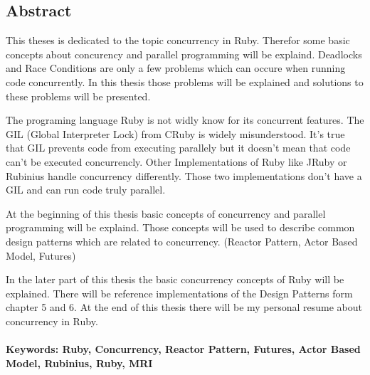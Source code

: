 \subsection*{Abstract}

This theses is dedicated to the topic concurrency in Ruby. Therefor some basic concepts about concurency and parallel programming will be explaind. Deadlocks and Race Conditions are only a few problems which can occure when running code concurrently. In this thesis those problems will be explained and solutions to these problems will be presented. 

The programing language Ruby is not widly know for its concurrent features. The GIL (Global Interpreter Lock) from CRuby is widely misunderstood. It's true that GIL prevents code from executing parallely but it doesn't mean that code can't be executed concurrencly. Other Implementations of Ruby like JRuby or Rubinius handle concurrency differently. Those two implementations don't have a GIL and can run code truly parallel.

At the beginning of this thesis basic concepts of concurrency and parallel programming will be explaind. Those concepts will be used to describe common design patterns which are related to concurrency. (Reactor Pattern, Actor Based Model, Futures)

In the later part of this thesis the basic concurrency concepts of Ruby will be explained. There will be reference implementations of the Design Patterns form chapter 5 and 6. At the end of this thesis there will be my personal resume about concurrency in Ruby.



\paragraph{Keywords:  Ruby, Concurrency, Reactor Pattern, Futures, Actor Based Model, Rubinius, Ruby, MRI}

